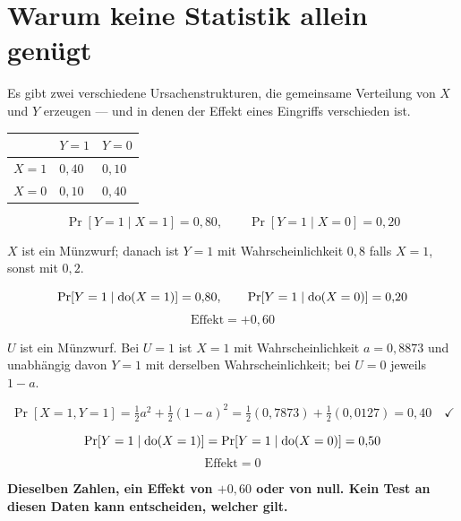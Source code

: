 \section{Warum keine Statistik allein genügt}

\begin{merksatz}
Es gibt zwei verschiedene Ursachenstrukturen, die  gemeinsame Verteilung von $X$ und $Y$ erzeugen --- und in denen der Effekt eines Eingriffs verschieden ist.

\begin{center}
{\small
\renewcommand{\arraystretch}{1.5}
\begin{tabular}{@{}P{2.4cm}P{2.2cm}P{2.2cm}@{}}
\toprule
& $Y=1$ & $Y=0$\\
\midrule
$X=1$ & $0{,}40$ & $0{,}10$\\
$X=0$ & $0{,}10$ & $0{,}40$\\
\bottomrule
\end{tabular}}
\end{center}
\[ \Pr[Y=1 \mid X=1] = 0{,}80, \qquad \Pr[Y=1 \mid X=0] = 0{,}20 \]

$X$ ist ein Münzwurf; danach ist $Y=1$ mit Wahrscheinlichkeit $0{,}8$ falls $X=1$, sonst mit $0{,}2$.

\[ \Pr[Y=1\mid\operatorname{do}(X=1)] = 0{,}80, \qquad \Pr[Y=1\mid\operatorname{do}(X=0)] = 0{,}20 \]
\[ \text{Effekt} = +0{,}60 \]

$U$ ist ein Münzwurf. Bei $U=1$ ist $X=1$ mit Wahrscheinlichkeit $a = 0{,}8873$ und unabhängig davon $Y=1$ mit derselben Wahrscheinlichkeit; bei $U=0$ jeweils $1-a$.

\[ \Pr[X=1,Y=1] = \tfrac12 a^{2} + \tfrac12(1-a)^{2} = \tfrac12(0{,}7873) + \tfrac12(0{,}0127) = 0{,}40 \quad \checkmark \]

\[ \Pr[Y=1\mid\operatorname{do}(X=1)] = \Pr[Y=1\mid\operatorname{do}(X=0)] = 0{,}50 \]
\[ \text{Effekt} = 0 \]

\begin{center}
\begin{minipage}{0.9\textwidth}
\textbf{Dieselben Zahlen, ein Effekt von $+0{,}60$ oder von null. Kein Test an diesen Daten kann entscheiden, welcher gilt.}
\end{minipage}
\end{center}

\begin{center}
\begin{minipage}{0.88\textwidth}
\end{minipage}
\end{center}


\end{merksatz}
